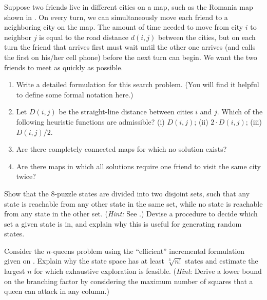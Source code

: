 \begin{exercise}%
Suppose two friends live in different cities on a map, such as the Romania map shown in .
On every turn, we can simultaneously move each friend to a neighboring city on the map.
The amount of time needed to move from city \(i\) to neighbor \(j\) is equal
to the road distance \(d(i,j)\) between the cities, but on each turn the friend that arrives
first must wait until the other one arrives (and calls the first on his/her cell phone) before the next turn can begin.
We want the two friends to meet as quickly as possible. 
\begin{enumerate}
\item Write a detailed formulation for this search problem. (You will find it helpful to define some formal notation here.)
\item Let \(D(i,j)\) be the straight-line distance between cities \(i\) and \(j\). 
Which of the following heuristic functions are admissible? (i) \(D(i,j)\); (ii) \(2\cdot D(i,j)\); (iii) \(D(i,j)/2\).
\item Are there completely connected maps for which no solution exists?
\item Are there maps in which all solutions require one friend to visit the same city twice?
\end{enumerate}
\end{exercise} 

\begin{exercise}
Show that the 8-puzzle states are divided
into two disjoint sets, such that any state is reachable from any other state in the same set, while no state is reachable from
any state in the other set. ({\em Hint:} See .)  Devise a
procedure to decide which set a given state is in,
and explain why this is useful
for generating random states.
\end{exercise} 

\begin{exercise}
Consider the \(n\)-queens problem using the ``efficient'' incremental
formulation given on .  Explain why the state
space has at least \(\sqrt[3]{n!}\) states and estimate the largest
\(n\) for which exhaustive exploration is feasible. ({\em Hint}:
Derive a lower bound on the branching factor by considering the
maximum number of squares that a queen can attack in any 
column.) 
\end{exercise} 

